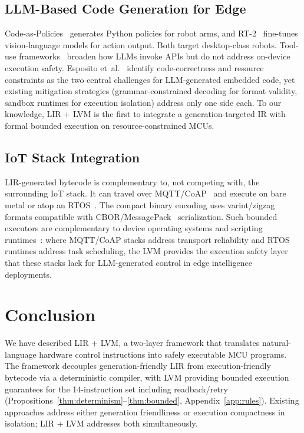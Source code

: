 \documentclass[a4paper,fleqn,longmktitle]{cas-dc}
\begin{document}
\subsection{LLM-Based Code Generation for Edge}

Code-as-Policies~\citep{liang2023code} generates Python policies for robot arms, and RT-2~\citep{brohan2023rt2} fine-tunes vision-language models for action output. Both target desktop-class robots. Tool-use frameworks~\citep{toolformer,gorilla} broaden how LLMs invoke APIs but do not address on-device execution safety. Esposito et~al.~\citep{esposito2024llm_embedded} identify code-correctness and resource constraints as the two central challenges for LLM-generated embedded code, yet existing mitigation strategies (grammar-constrained decoding for format validity, sandbox runtimes for execution isolation) address only one side each. To our knowledge, LIR + LVM is the first to integrate a generation-targeted IR with formal bounded execution on resource-constrained MCUs.

\subsection{IoT Stack Integration}

LIR-generated bytecode is complementary to, not competing with, the surrounding IoT stack. It can travel over MQTT/CoAP~\citep{mqtt,coap} and execute on bare metal or atop an RTOS~\citep{freertos,riot,zephyr}. The compact binary encoding uses varint/zigzag formats compatible with CBOR/MessagePack~\citep{cbor,msgpack} serialization. Such bounded executors are complementary to device operating systems and scripting runtimes~\citep{bormann2014rfc7228,alfuqaha2015iot_survey}: where MQTT/CoAP stacks address transport reliability and RTOS runtimes address task scheduling, the LVM provides the execution safety layer that these stacks lack for LLM-generated control in edge intelligence deployments.

\section{Conclusion}
\label{sec:conclusion}

We have described LIR + LVM, a two-layer framework that translates natural-language hardware control instructions into safely executable MCU programs. The framework decouples generation-friendly LIR from execution-friendly bytecode via a deterministic compiler, with LVM providing bounded execution guarantees for the 14-instruction set including readback/retry (Propositions~\ref{thm:determinism}--\ref{thm:bounded}, Appendix~\ref{app:rules}). Existing approaches address either generation friendliness or execution compactness in isolation; LIR + LVM addresses both simultaneously.
\end{document}
